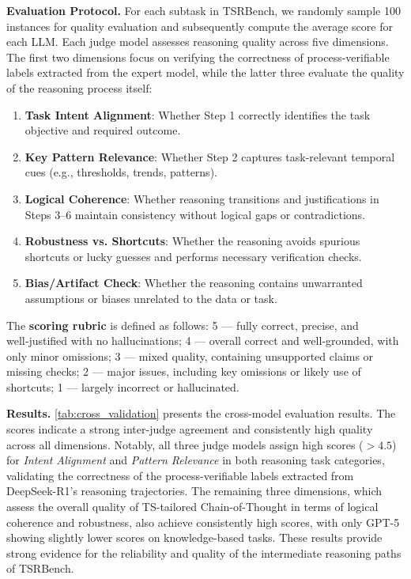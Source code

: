 \documentclass{article}
\theoremstyle{plain}
\theoremstyle{definition}
\theoremstyle{remark}
\begin{document}
\textbf{Evaluation Protocol.} For each subtask in TSRBench, we randomly sample 100 instances for quality evaluation and subsequently compute the average score for each LLM. Each judge model assesses reasoning quality across five dimensions. The first two dimensions focus on verifying the correctness of process-verifiable labels extracted from the expert model, while the latter three evaluate the quality of the reasoning process itself:

\begin{enumerate}[itemsep=0pt]
\item \textbf{Task Intent Alignment}: Whether Step 1 correctly identifies the task objective and required outcome.
\item \textbf{Key Pattern Relevance}: Whether Step 2 captures task-relevant temporal cues (e.g., thresholds, trends, patterns).
\item \textbf{Logical Coherence}: Whether reasoning transitions and justifications in Steps 3–6 maintain consistency without logical gaps or contradictions.
\item \textbf{Robustness vs. Shortcuts}: Whether the reasoning avoids spurious shortcuts or lucky guesses and performs necessary verification checks.
\item \textbf{Bias/Artifact Check}: Whether the reasoning contains unwarranted assumptions or biases unrelated to the data or task.
\end{enumerate}

The \textbf{scoring rubric} is defined as follows: 5 — fully correct, precise, and well‑justified with no hallucinations; 4 — overall correct and well‑grounded, with only minor omissions; 3 — mixed quality, containing unsupported claims or missing checks; 2 — major issues, including key omissions or likely use of shortcuts; 1 — largely incorrect or hallucinated.

\textbf{Results.} \autoref{tab:cross_validation} presents the cross-model evaluation results. The scores indicate a strong inter-judge agreement and consistently high quality across all dimensions. Notably, all three judge models assign high scores ($>4.5$) for \textit{Intent Alignment} and \textit{Pattern Relevance} in both reasoning task categories, validating the correctness of the process-verifiable labels extracted from DeepSeek-R1's reasoning trajectories. The remaining three dimensions, which assess the overall quality of TS-tailored Chain-of-Thought in terms of logical coherence and robustness, also achieve consistently high scores, with only GPT-5 showing slightly lower scores on knowledge-based tasks. These results provide strong evidence for the reliability and quality of the intermediate reasoning paths of TSRBench.
\end{document}
